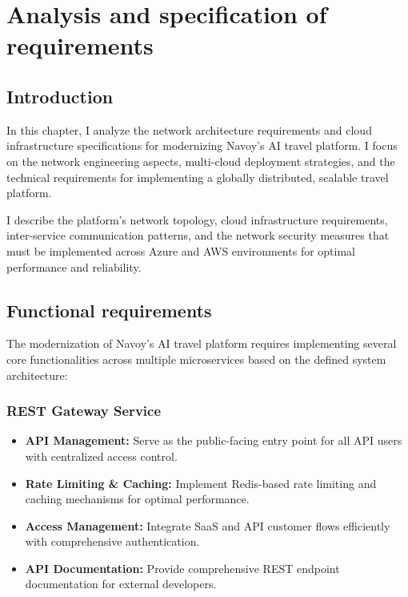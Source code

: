 \chapter{Analysis and specification of requirements}
\minitoc
\newpage

\setcounter{secnumdepth}{0} %
\section{Introduction}
In this chapter, I analyze the network architecture requirements and cloud infrastructure specifications for modernizing Navoy's AI travel platform. I focus on the network engineering aspects, multi-cloud deployment strategies, and the technical requirements for implementing a globally distributed, scalable travel platform.

I describe the platform's network topology, cloud infrastructure requirements, inter-service communication patterns, and the network security measures that must be implemented across Azure and AWS environments for optimal performance and reliability.

\setcounter{secnumdepth}{2} %
\section{Functional requirements}
The modernization of Navoy's AI travel platform requires implementing several core functionalities across multiple microservices based on the defined system architecture:

\subsection{REST Gateway Service}
\begin{itemize}
    \item \textbf{API Management:} Serve as the public-facing entry point for all API users with centralized access control.
    \item \textbf{Rate Limiting \& Caching:} Implement Redis-based rate limiting and caching mechanisms for optimal performance.
    \item \textbf{Access Management:} Integrate SaaS and API customer flows efficiently with comprehensive authentication.
    \item \textbf{API Documentation:} Provide comprehensive REST endpoint documentation for external developers.
\end{itemize}

